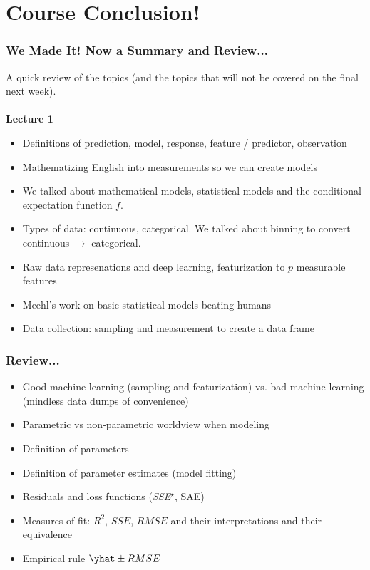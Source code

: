 \documentclass[handout]{beamer}
\begin{document}
\section{Course Conclusion!}

\begin{frame}\frametitle{We Made It! Now a Summary and Review...}
\small
A quick review of the topics (and the topics that will not be covered on the final next week).\\~\\

\textbf{Lecture 1}

\begin{itemize}
\item Definitions of prediction, model, response, feature / predictor, observation \pause
\item Mathematizing English into measurements so we can create models \pause
\item We talked about mathematical models, statistical models and the conditional expectation function $f$. \pause
\item Types of data: continuous, categorical. We talked about binning to convert continuous $\rightarrow$ categorical. \pause
\item Raw data represenations and deep learning, featurization to $p$ measurable features \pause
\item Meehl's work on basic statistical models beating humans \pause
\item Data collection: sampling and measurement to create a data frame
\end{itemize}

\end{frame}

\begin{frame}\frametitle{Review...}

\begin{itemize}
\item Good machine learning (sampling and featurization) vs. bad machine learning (mindless data dumps of convenience)
\item Parametric vs non-parametric worldview when modeling
\item Definition of parameters
\item Definition of parameter estimates (model fitting)
\item Residuals and loss functions (\emph{SSE}$^\star$, SAE)
\item Measures of fit: $R^2$, $SSE$, $RMSE$ and their interpretations and their equivalence
\item Empirical rule $\yhat \pm RMSE$
\end{itemize}
	
\end{frame}
\end{document}
